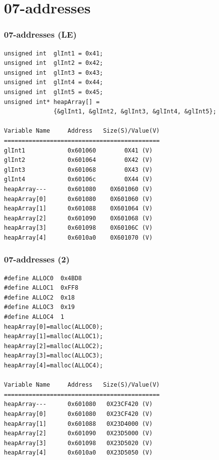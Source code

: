\documentclass[xcolor=table, notheorems, hyperref={pdfpagelabels=false}]{beamer}
\begin{document}
\section{07-addresses}
\begin{frame}[fragile]
\frametitle{07-addresses (LE)}
\begin{lstlisting}[basicstyle=\ttfamily\footnotesize]
unsigned int  glInt1 = 0x41;
unsigned int  glInt2 = 0x42;
unsigned int  glInt3 = 0x43;
unsigned int  glInt4 = 0x44;
unsigned int  glInt5 = 0x45;
unsigned int* heapArray[] = 
              {&glInt1, &glInt2, &glInt3, &glInt4, &glInt5};

Variable Name     Address   Size(S)/Value(V)
============================================
glInt1            0x601060        0X41 (V) 
glInt2            0x601064        0X42 (V) 
glInt3            0x601068        0X43 (V) 
glInt4            0x60106c        0X44 (V) 
heapArray---      0x601080    0X601060 (V) 
heapArray[0]      0x601080    0X601060 (V) 
heapArray[1]      0x601088    0X601064 (V) 
heapArray[2]      0x601090    0X601068 (V) 
heapArray[3]      0x601098    0X60106C (V) 
heapArray[4]      0x6010a0    0X601070 (V)
\end{lstlisting}

\end{frame}

\begin{frame}[fragile]
\frametitle{07-addresses (2)}
\begin{lstlisting}[basicstyle=\ttfamily\footnotesize]
#define ALLOC0  0x4BD8
#define ALLOC1  0xFF8
#define ALLOC2  0x18
#define ALLOC3  0x19
#define ALLOC4  1
heapArray[0]=malloc(ALLOC0);
heapArray[1]=malloc(ALLOC1);
heapArray[2]=malloc(ALLOC2);
heapArray[3]=malloc(ALLOC3);
heapArray[4]=malloc(ALLOC4);

Variable Name     Address   Size(S)/Value(V)
============================================
heapArray---      0x601080   0X23CF420 (V) 
heapArray[0]      0x601080   0X23CF420 (V) 
heapArray[1]      0x601088   0X23D4000 (V) 
heapArray[2]      0x601090   0X23D5000 (V) 
heapArray[3]      0x601098   0X23D5020 (V) 
heapArray[4]      0x6010a0   0X23D5050 (V)
\end{lstlisting}

\end{frame}
\end{document}
